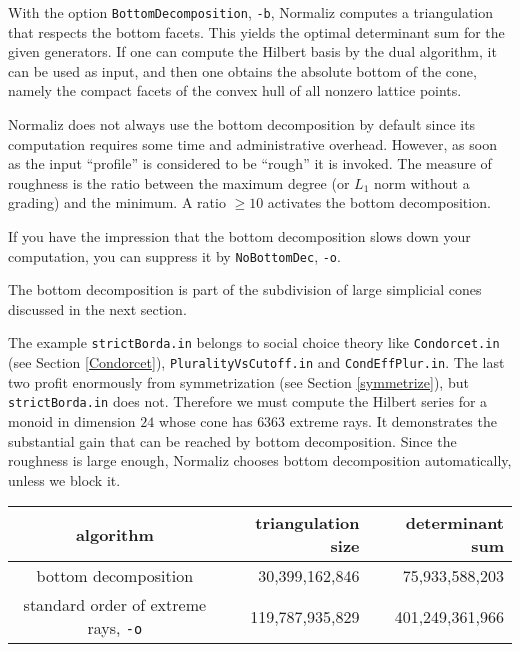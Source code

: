 \documentclass[12pt,a4paper]{scrartcl}
\theoremstyle{definition}
\def\ttt{\texttt}
\begin{document}
{\begin{center}
	\end{center}
	With the option \texttt{BottomDecomposition}, \texttt{-b}, Normaliz computes a triangulation that respects the bottom facets. This yields the optimal determinant sum for the given generators. If one can compute the Hilbert basis by the dual algorithm, it can be used as input, and then one obtains the absolute bottom of the cone, namely the compact facets of the convex hull of all nonzero lattice points. 
	
	Normaliz does not always use the bottom decomposition by default since its computation requires some time and administrative overhead. However, as soon as the input ``profile'' is considered to be ``rough'' it is invoked. The measure of roughness is the ratio between the maximum degree (or $L_1$ norm without a grading) and the minimum. A ratio $\ge 10$ activates the bottom decomposition. 
	
	If you have the impression that the bottom decomposition slows down your computation, you can suppress it by \texttt{NoBottomDec}, \texttt{-o}.
	
	The bottom decomposition is part of the subdivision of large simplicial cones discussed in the next section.
	
	The example \verb|strictBorda.in| belongs to social choice theory like \verb|Condorcet.in| (see Section \ref{Condorcet}), \verb|PluralityVsCutoff.in| and \verb|CondEffPlur.in|. The last two profit enormously from symmetrization (see Section \ref{symmetrize}), but \verb| strictBorda.in| does not. Therefore we must compute the Hilbert series for a monoid in dimension $24$ whose cone has $6363$ extreme rays. It demonstrates the substantial gain that can be reached by bottom decomposition. Since the roughness is large enough, Normaliz chooses bottom decomposition automatically, unless we block it. 
	\begin{center}
		\begin{tabular}{|c|r|r|}\hline
			algorithm	& triangulation size& determinant sum \\ \hline
			bottom decomposition& 30,399,162,846 &75,933,588,203 \\ \hline
			standard order of extreme rays,  \ttt{-o} & 119,787,935,829 & 401,249,361,966\\ \hline
		\end{tabular}
	\end{center}
	
}
\end{document}
